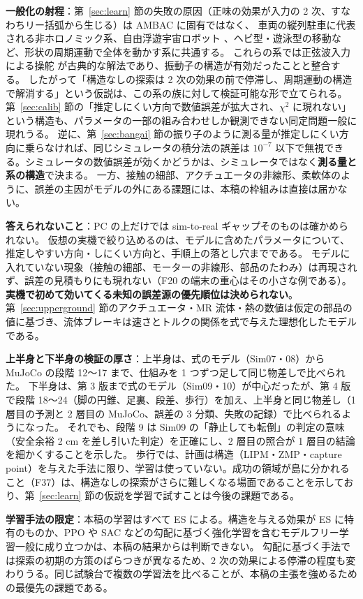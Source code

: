 \documentclass[paper=a4paper,fontsize=10pt,twocolumn,column_gap=2zw,line_length=24zw,number_of_lines=46,head_space=20mm]{jlreq}
\begin{document}
\textbf{一般化の射程}：第~\ref{sec:learn} 節の失敗の原因（正味の効果が入力の 2 次、すなわちリー括弧から生じる）は AMBAC に固有ではなく、
車両の縦列駐車に代表される非ホロノミック系、自由浮遊宇宙ロボット \cite{nakamura1991}、ヘビ型・遊泳型の移動など、形状の周期運動で全体を動かす系に共通する。
これらの系では正弦波入力による操舵 \cite{murray1993} が古典的な解法であり、振動子の構造が有効だったことと整合する。
したがって「構造なしの探索は 2 次の効果の前で停滞し、周期運動の構造で解消する」という仮説は、この系の族に対して検証可能な形で立てられる。
第~\ref{sec:calib} 節の「推定しにくい方向で数値誤差が拡大され、$\chi^2$ に現れない」という構造も、パラメータの一部の組み合わせしか観測できない同定問題一般に現れうる。
逆に、第~\ref{sec:bangai} 節の振り子のように測る量が推定しにくい方向に乗らなければ、同じシミュレータの積分法の誤差は $10^{-7}$ 以下で無視できる。シミュレータの数値誤差が効くかどうかは、シミュレータではなく\textbf{測る量と系の構造}で決まる。
一方、接触の細部、アクチュエータの非線形、柔軟体のように、誤差の主因がモデルの外にある課題には、本稿の枠組みは直接は届かない。

\textbf{答えられないこと}：PC の上だけでは sim-to-real ギャップそのものは確かめられない。
仮想の実機で絞り込めるのは、モデルに含めたパラメータについて、推定しやすい方向・しにくい方向と、手順上の落とし穴までである。
モデルに入れていない現象（接触の細部、モーターの非線形、部品のたわみ）は再現されず、誤差の見積もりにも現れない（F20 の端末の重心はその小さな例である）。\textbf{実機で初めて効いてくる未知の誤差源の優先順位は決められない}。
第~\ref{sec:upperground} 節のアクチュエータ・MR 流体・熱の数値は仮定の部品の値に基づき、流体ブレーキは速さとトルクの関係を式で与えた理想化したモデルである。

\textbf{上半身と下半身の検証の厚さ}：上半身は、式のモデル（Sim07・08）から MuJoCo の段階 12〜17 まで、仕組みを 1 つずつ足して同じ物差しで比べられた。
下半身は、第 3 版まで式のモデル（Sim09・10）が中心だったが、第 4 版で段階 18〜24（脚の円錐、足裏、段差、歩行）を加え、上半身と同じ物差し（1 層目の予測と 2 層目の MuJoCo、誤差の 3 分類、失敗の記録）で比べられるようになった。
それでも、段階 9 は Sim09 の「静止しても転倒」の判定の意味（安全余裕 2 cm を差し引いた判定）を正確にし、2 層目の照合が 1 層目の結論を細かくすることを示した。
歩行では、計画は構造（LIPM・ZMP・capture point）を与えた手法に限り、学習は使っていない。成功の領域が島に分かれること（F37）は、構造なしの探索がさらに難しくなる場面であることを示しており、第~\ref{sec:learn} 節の仮説を学習で試すことは今後の課題である。

\textbf{学習手法の限定}：本稿の学習はすべて ES による。構造を与える効果が ES に特有のものか、PPO や SAC などの勾配に基づく強化学習を含むモデルフリー学習一般に成り立つかは、本稿の結果からは判断できない。
勾配に基づく手法では探索の初期の方策のばらつきが異なるため、2 次の効果による停滞の程度も変わりうる。同じ試験台で複数の学習法を比べることが、本稿の主張を強めるための最優先の課題である。
\end{document}
